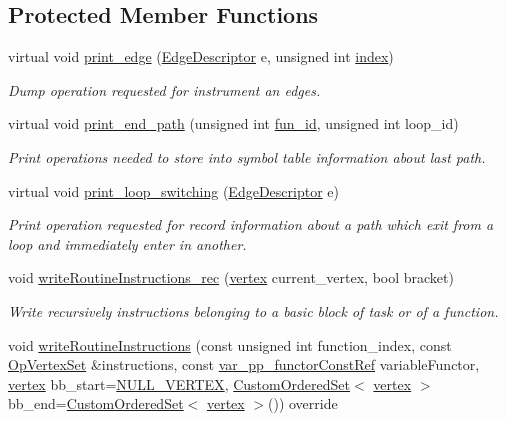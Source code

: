 \subsection*{Protected Member Functions}
\begin{DoxyCompactItemize}
\item 
virtual void \hyperlink{classEdgeCWriter_afafb806eb259b1e582c4b4cd9abe201a}{print\+\_\+edge} (\hyperlink{graph_8hpp_a9eb9afea34e09f484b21f2efd263dd48}{Edge\+Descriptor} e, unsigned int \hyperlink{tutorial__pact__2019_2Introduction_2third_2include_2Keccak_8h_a028c9bdc8344cca38ab522a337074797}{index})
\begin{DoxyCompactList}\small\item\em Dump operation requested for instrument an edges. \end{DoxyCompactList}\item 
virtual void \hyperlink{classEdgeCWriter_afb0e9ae8b8f6b8d697f555dbda6c90ab}{print\+\_\+end\+\_\+path} (unsigned int \hyperlink{classEdgeCWriter_a24e5a49302d7900304d7c020889aa979}{fun\+\_\+id}, unsigned int loop\+\_\+id)
\begin{DoxyCompactList}\small\item\em Print operations needed to store into symbol table information about last path. \end{DoxyCompactList}\item 
virtual void \hyperlink{classEdgeCWriter_a38bd255fe79b665fb52cf5bf566255ce}{print\+\_\+loop\+\_\+switching} (\hyperlink{graph_8hpp_a9eb9afea34e09f484b21f2efd263dd48}{Edge\+Descriptor} e)
\begin{DoxyCompactList}\small\item\em Print operation requested for record information about a path which exit from a loop and immediately enter in another. \end{DoxyCompactList}\item 
void \hyperlink{classEdgeCWriter_a8bd9dbf867c6937dd51d309ef4f27073}{write\+Routine\+Instructions\+\_\+rec} (\hyperlink{graph_8hpp_abefdcf0544e601805af44eca032cca14}{vertex} current\+\_\+vertex, bool bracket)
\begin{DoxyCompactList}\small\item\em Write recursively instructions belonging to a basic block of task or of a function. \end{DoxyCompactList}\item 
void \hyperlink{classEdgeCWriter_a26e88f61025b2993b8608ef28951cb9f}{write\+Routine\+Instructions} (const unsigned int function\+\_\+index, const \hyperlink{classOpVertexSet}{Op\+Vertex\+Set} \&instructions, const \hyperlink{var__pp__functor_8hpp_a8a6b51b6519401d911398943510557f0}{var\+\_\+pp\+\_\+functor\+Const\+Ref} variable\+Functor, \hyperlink{graph_8hpp_abefdcf0544e601805af44eca032cca14}{vertex} bb\+\_\+start=\hyperlink{graph_8hpp_ac3c33c45c396860b76e8aff4dd2b8158}{N\+U\+L\+L\+\_\+\+V\+E\+R\+T\+EX}, \hyperlink{classCustomOrderedSet}{Custom\+Ordered\+Set}$<$ \hyperlink{graph_8hpp_abefdcf0544e601805af44eca032cca14}{vertex} $>$ bb\+\_\+end=\hyperlink{classCustomOrderedSet}{Custom\+Ordered\+Set}$<$ \hyperlink{graph_8hpp_abefdcf0544e601805af44eca032cca14}{vertex} $>$()) override

\end{DoxyCompactItemize}
